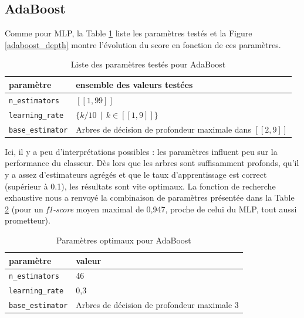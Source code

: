 \documentclass[a4paper]{report}
\begin{document}
\subsection{AdaBoost}

Comme pour MLP, la Table \ref{params_ada} liste les paramètres testés et la Figure \ref{adaboost_depth} montre l'évolution du score en fonction de ces paramètres.

\begin{table}
\centering
\begin{tabular}{ll}
paramètre & ensemble des valeurs testées \\
\hline
\texttt{n\_estimators} & $[\![1, 99]\!]$ \\
\texttt{learning\_rate} & $\{k/10 \>\> | \>\> k \in [\![1, 9]\!] \}$ \\
\texttt{base\_estimator} & Arbres de décision de profondeur maximale dans $[\![2, 9]\!]$\\
\end{tabular}
\caption{Liste des paramètres testés pour AdaBoost\label{params_ada}}
\end{table}

Ici, il y a peu d'interprétations possibles : les paramètres influent peu sur la performance du classeur. Dès lors que les arbres sont suffisamment profonds, qu'il y a assez d'estimateurs agrégés et que le taux d'apprentissage est correct (supérieur à 0.1), les résultats sont vite optimaux. La fonction de recherche exhaustive nous a renvoyé la combinaison de paramètres présentée dans la Table \ref{best_params_ada} (pour un \emph{f1-score} moyen maximal de 0,947, proche de celui du MLP, tout aussi prometteur).

\begin{table}
\centering
\begin{tabular}{ll}
paramètre & valeur \\
\hline
\texttt{n\_estimators} & 46 \\
\texttt{learning\_rate} & 0,3 \\
\texttt{base\_estimator} & Arbres de décision de profondeur maximale 3\\
\end{tabular}
\caption{Paramètres optimaux pour AdaBoost\label{best_params_ada}}
\end{table}
\end{document}
